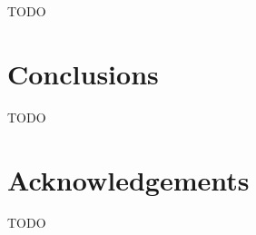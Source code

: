 \documentclass[fleqn,usenatbib]{mnras}
\begin{document}
TODO
\section{Conclusions}

TODO

\section*{Acknowledgements}

TODO









\appendix



\bsp	%
\label{lastpage}
\end{document}
